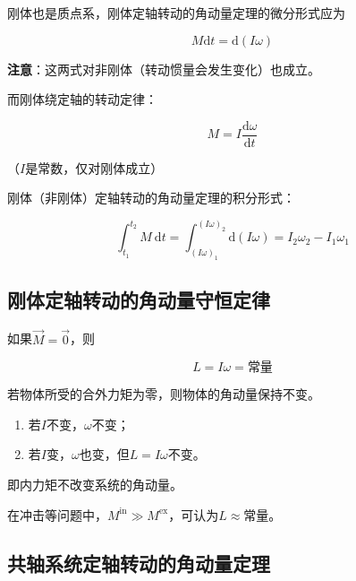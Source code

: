 \documentclass[
	12pt, %
	a4paper, %
]{myLegrandOrangeBook}
\newcommand{\rmd}{\mathrm{d}}
\newcommand{\deriv}[2]{\frac{\rmd #1}{\rmd #2}}
\begin{document}
\begin{theorem}[刚体定轴转动的角动量定理]

    刚体也是质点系，刚体定轴转动的角动量定理的微分形式应为

    \begin{equation}
        M \rmd t = \rmd \left(I \omega\right)
    \end{equation}

    \textbf{注意}：这两式对非刚体（转动惯量会发生变化）也成立。

    而刚体绕定轴的转动定律：

    \begin{equation}
        M = I \deriv{\omega}{t}
    \end{equation}

    （\(I\)是常数，仅对刚体成立）

    刚体（非刚体）定轴转动的角动量定理的积分形式：

    \begin{equation}
        \int_{t_1}^{t_2} M \mathrm{~d} t=\int_{\left(I \omega\right)_1}^{\left(I \omega\right)_2} \rmd \left(I \omega\right)
        =I_2 \omega_2-I_1 \omega_1
    \end{equation}
\end{theorem}

\subsection{刚体定轴转动的角动量守恒定律}

    如果\(\overrightarrow{M}=\overrightarrow{0}\)，则

    \begin{equation}
        L = I \omega = \text{常量}
    \end{equation}

    若物体所受的合外力矩为零，则物体的角动量保持不变。

    \begin{enumerate}
        \item 若\(I\)不变，\(\omega\)不变；
        \item 若\(I\)变，\(\omega\)也变，但\(L = I \omega\)不变。
    \end{enumerate}

    即内力矩不改变系统的角动量。

    在冲击等问题中，\(M^{\text{in}} \gg  M^{\text{ex}}\)，可认为\(L \approx \text{常量}\)。

\subsection{共轴系统定轴转动的角动量定理}
\end{document}

